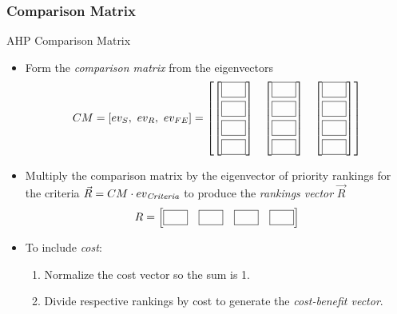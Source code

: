 \documentclass[10pt,handout,hyperref={colorlinks=true,linkcolor=blue,citecolor=citelink,urlcolor=gray}]{beamer}
\newcounter{e_temp}
\begin{document}
\begin{frame}[t,label=TheRanking]
\frametitle{Comparison Matrix}
\begin{block}{AHP Comparison Matrix}
\begin{itemize}
\item Form the \emph{comparison matrix} from the eigenvectors
\vspace{-1ex}
{\footnotesize
\[	CM = \left[ ev_S, \ ev_R, \ ev_{FE}\right] = \begin{bmatrix}
		\begin{bmatrix} \fbox{\phantom{XX}} \\[0.75ex] \fbox{\phantom{XX}} \\[0.75ex] \fbox{\phantom{XX}}\\[0.75ex] \fbox{\phantom{XX}}  \end{bmatrix}
	     & \begin{bmatrix} \fbox{\phantom{XX}} \\[0.75ex] \fbox{\phantom{XX}} \\[0.75ex] \fbox{\phantom{XX}}\\[0.75ex] \fbox{\phantom{XX}}  \end{bmatrix}
	     & \begin{bmatrix} \fbox{\phantom{XX}} \\[0.75ex] \fbox{\phantom{XX}} \\[0.75ex] \fbox{\phantom{XX}}\\[0.75ex] \fbox{\phantom{XX}}  \end{bmatrix}
	\end{bmatrix}	\]
}
\pause

\item Multiply the comparison matrix by the eigenvector of priority rankings for the criteria $\vec{R}=CM \cdot ev_\text{\it Criteria}$ to produce the \emph{rankings vector} $\vec{R}$
\[	R = \begin{bmatrix} \fbox{\phantom{XX}} & \fbox{\phantom{XX}} & \fbox{\phantom{XX}} & \fbox{\phantom{XX}} \end{bmatrix}
	\vspace{-1ex}	\]
\pause

\item To include \emph{cost}: 
	\begin{enumerate}
	\item Normalize the cost vector so the sum is 1. 
	\item Divide respective rankings by cost to generate the \emph{cost-benefit vector}.
	\end{enumerate}
\end{itemize}
\end{block}
\end{frame}
\end{document}
